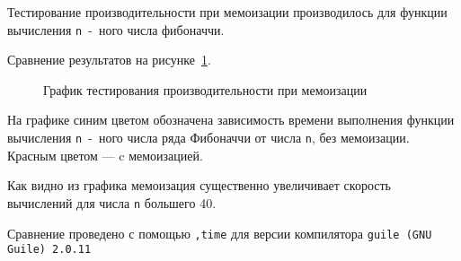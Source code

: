         Тестирование производительности при мемоизации производилось для функции вычисления \verb,n,~-~ного числа фибоначчи.

        Сравнение результатов на рисунке~\ref{pic:memo}.

        \begin{figure}[ht!]
            \centering
            \caption{График тестирования производительности при мемоизации}
            \label{pic:memo}
        \end{figure}

    На графике синим цветом обозначена зависимость времени выполнения функции вычисления \verb,n,~-~ного числа ряда Фибоначчи от числа \verb,n,, без мемоизации.
    Красным цветом --- c мемоизацией.

    Как видно из графика мемоизация существенно увеличивает скорость вычислений для числа \verb,n, большего 40.

    Сравнение проведено с помощью \verb;,time; для версии компилятора \verb,guile (GNU Guile) 2.0.11,
